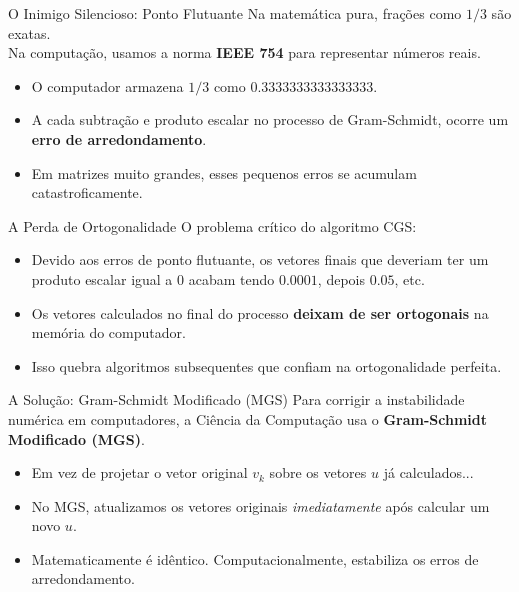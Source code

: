 \documentclass{beamer}
\begin{document}
\begin{frame}{O Inimigo Silencioso: Ponto Flutuante}
Na matemática pura, frações como $1/3$ são exatas. \\
Na computação, usamos a norma \textbf{IEEE 754} para representar números reais.
\vspace{0.3cm}
\begin{itemize}
    \item O computador armazena $1/3$ como $0.3333333333333333$.
    \item A cada subtração e produto escalar no processo de Gram-Schmidt, ocorre um \textbf{erro de arredondamento}.
    \item Em matrizes muito grandes, esses pequenos erros se acumulam catastroficamente.
\end{itemize}
\end{frame}

\begin{frame}{A Perda de Ortogonalidade}
O problema crítico do algoritmo CGS:
\vspace{0.3cm}
\begin{itemize}
    \item Devido aos erros de ponto flutuante, os vetores finais que deveriam ter um produto escalar igual a $0$ acabam tendo $0.0001$, depois $0.05$, etc.
    \item Os vetores calculados no final do processo \textbf{deixam de ser ortogonais} na memória do computador.
    \item Isso quebra algoritmos subsequentes que confiam na ortogonalidade perfeita.
\end{itemize}
\end{frame}

\begin{frame}{A Solução: Gram-Schmidt Modificado (MGS)}
Para corrigir a instabilidade numérica em computadores, a Ciência da Computação usa o \textbf{Gram-Schmidt Modificado (MGS)}.
\vspace{0.3cm}
\begin{itemize}
    \item Em vez de projetar o vetor original $v_k$ sobre os vetores $u$ já calculados...
    \item No MGS, atualizamos os vetores originais \textit{imediatamente} após calcular um novo $u$.
    \item Matematicamente é idêntico. Computacionalmente, estabiliza os erros de arredondamento.
\end{itemize}
\end{frame}
\end{document}
